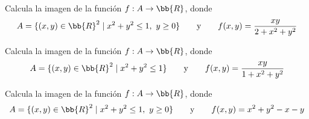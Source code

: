 \begin{ejercicio}
    Calcula la imagen de la función $f:A\to \bb{R}$, donde
    \begin{equation*}
        A = \{(x,y)\in \bb{R}^2\mid x^2+y^2\leq 1,~y\geq 0\}
        \qquad \text{y} \qquad
        f(x,y)=\frac{xy}{2+x^2+y^2}
    \end{equation*}
\end{ejercicio}



\begin{ejercicio}
    Calcula la imagen de la función $f:A\to \bb{R}$, donde
    \begin{equation*}
        A = \{(x,y)\in \bb{R}^2\mid x^2+y^2\leq 1\}
        \qquad \text{y} \qquad
        f(x,y)=\frac{xy}{1+x^2+y^2}
    \end{equation*}
\end{ejercicio}



\begin{ejercicio}
    Calcula la imagen de la función $f:A\to \bb{R}$, donde
    \begin{equation*}
        A = \{(x,y)\in \bb{R}^2\mid x^2+y^2\leq 1,~y\geq 0\}
        \qquad \text{y} \qquad
        f(x,y)=x^2+y^2-x-y
    \end{equation*}
\end{ejercicio}